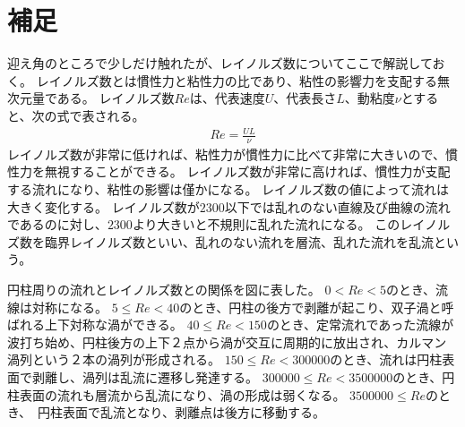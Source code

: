 \documentclass[10pt,b5paper,papersize,dvipdfmx]{jsbook}
\begin{document}
\section{補足}
迎え角のところで少しだけ触れたが、レイノルズ数についてここで解説しておく。
レイノルズ数とは慣性力と粘性力の比であり、粘性の影響力を支配する無次元量である。
レイノルズ数$Re$は、代表速度$U$、代表長さ$L$、動粘度$\nu $とすると、次の式で表される。
\begin{align}
  Re = \frac{UL}{\nu}
\end{align}
レイノルズ数が非常に低ければ、粘性力が慣性力に比べて非常に大きいので、慣性力を無視することができる。
レイノルズ数が非常に高ければ、慣性力が支配する流れになり、粘性の影響は僅かになる。
レイノルズ数の値によって流れは大きく変化する。
レイノルズ数が$2300$以下では乱れのない直線及び曲線の流れであるのに対し、$2300$より大きいと不規則に乱れた流れになる。
このレイノルズ数を臨界レイノルズ数といい、乱れのない流れを層流、乱れた流れを乱流という。
\par
円柱周りの流れとレイノルズ数との関係を図に表した。
$0<Re<5$のとき、流線は対称になる。
$5\le Re<40$のとき、円柱の後方で剥離が起こり、双子渦と呼ばれる上下対称な渦ができる。
$40\le Re<150$のとき、定常流れであった流線が波打ち始め、円柱後方の上下２点から渦が交互に周期的に放出され、カルマン渦列という２本の渦列が形成される。
$150\le Re<300000$のとき、流れは円柱表面で剥離し、渦列は乱流に遷移し発達する。
$300000\le Re<3500000$のとき、円柱表面の流れも層流から乱流になり、渦の形成は弱くなる。
$3500000\le Re$のとき、　円柱表面で乱流となり、剥離点は後方に移動する。
\end{document}
